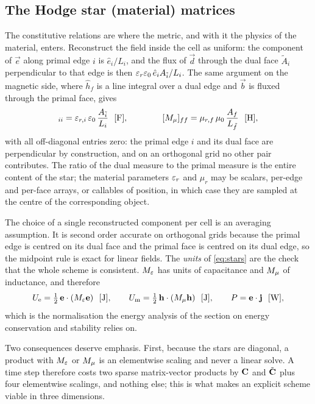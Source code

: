 \subsection{The Hodge star (material) matrices}
\label{sec:hodge}

The constitutive relations are where the metric, and with it the physics of the material, enters. Reconstruct the
field inside the cell as uniform: the component of $\vec e$ along primal edge $i$ is $\hat e_i/L_i$, and the flux
of $\vec d$ through the dual face $\tilde A_i$ perpendicular to that edge is then
$\varepsilon_r\varepsilon_0\,\hat e_i A_{\tilde i}/L_i$. The same argument on the magnetic side, where $\hat h_f$ is a line
integral over a dual edge and $\vec b$ is fluxed through the primal face, gives
\begin{equation}
  [\Em]_{ii} = \eps_{r,i}\,\eps_0\,\frac{A_{\tilde i}}{L_i}\ \ [\mathrm{F}],
  \qquad\qquad
  [\Mm]_{ff} = \mu_{r,f}\,\mu_0\,\frac{A_f}{L_{\tilde f}}\ \ [\mathrm{H}],
  \label{eq:stars}
\end{equation}
with all off-diagonal entries zero: the primal edge $i$ and its dual face are perpendicular by construction, and
on an orthogonal grid no other pair contributes. The ratio of the dual measure to the primal measure is the entire
content of the star; the material parameters $\varepsilon_r$ and $\mu_r$ may be scalars, per-edge and per-face arrays, or
callables of position, in which case they are sampled at the centre of the corresponding object.

The choice of a single reconstructed component per cell is an averaging assumption. It is second order accurate on
orthogonal grids because the primal edge is centred on its dual face and the primal face is centred on its dual
edge, so the midpoint rule is exact for linear fields. The \emph{units} of \eqref{eq:stars} are the check that the
whole scheme is consistent. ${M_{\varepsilon}}$ has units of capacitance and ${M_{\mu}}$ of inductance, and therefore
\begin{equation}
  U_{\mathrm{e}} = \tfrac12\,\mathbf{e}\cdot(\Em\mathbf{e})\ \ [\mathrm{J}], \qquad
  U_{\mathrm{m}} = \tfrac12\,\mathbf{h}\cdot(\Mm\mathbf{h})\ \ [\mathrm{J}], \qquad
  P = \mathbf{e}\cdot\mathbf{j}\ \ [\mathrm{W}],
  \label{eq:energies}
\end{equation}
which is the normalisation the energy analysis of the section on energy conservation and stability relies on.

Two consequences deserve emphasis. First, because the stars are diagonal, a product with ${M_{\varepsilon}}$ or ${M_{\mu}}$ is an
elementwise scaling and never a linear solve. A time step therefore costs two sparse matrix-vector products by
$\mathbf{C}$ and $\tilde{\mathbf{C}}$ plus four elementwise scalings, and nothing else; this is what makes an explicit scheme
viable in three dimensions.


